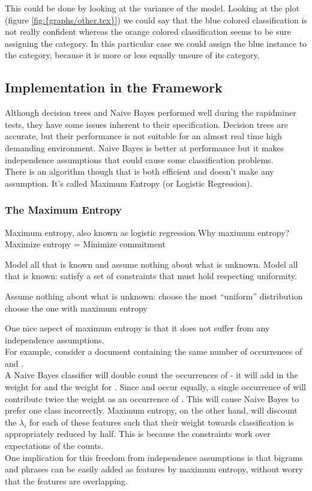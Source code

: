 

This could be done by looking at the variance of the model. Looking at the plot (figure \ref{fig:{graphs/other.tex}}) we could say that the blue colored classification is not really confident whereas 
the orange colored classification seems to be sure assigning the  category. In this particular case we could assign the blue instance to the  category, because it is more or less 
equally unsure of its category.


\subsection{Implementation in the Framework}
Although decision trees and Naive Bayes performed well during the rapidminer tests, they have some issues inherent to their specification. Decision trees are accurate, but their performance is 
not suitable for an almost real time high demanding environment. Naive Bayes is better at performance but it makes independence assumptions that could cause some classification problems.\\
There is an algorithm though that is both efficient and doesn't make any assumption. It's called Maximum Entropy (or Logistic Regression).

\subsubsection{The Maximum Entropy}
Maximum entropy, also known as logistic regression
Why maximum entropy?
Maximize entropy = Minimize commitment

Model all that is known and assume nothing about what is unknown. 
Model all that is known: satisfy a set of constraints that must hold respecting uniformity.

Assume nothing about what is unknown: 
   choose the most “uniform” distribution 
   choose the one with maximum entropy

One nice aspect of maximum entropy is that it does not suffer from any independence assumptions.\\
For example, consider a document containing the same number of occurrences of  and .\\
A Naive Bayes classifier will double count the occurrences of  
- it will add in the weight for  and the weight for . Since  and
 occur equally, a single occurrence of  will contribute twice the weight as an occurrence of . This will cause Naive Bayes to prefer one class 
incorrectly.
Maximum entropy, on the other hand, will discount the $\lambda_i$ for each of these features such that their weight towards classification is appropriately reduced by half.
This is because the constraints work over expectations of the counts. \\
One implication for this freedom from independence assumptions is that bigrams and phrases can be easily added as features by maximum entropy, without worry that the features are overlapping.


